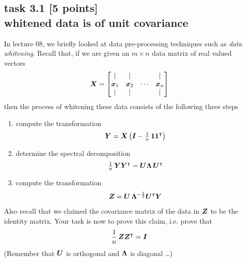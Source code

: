 
\subsection*{task 3.1 [5 points] \\[1ex] whitened data is of unit covariance}

In lecture 08, we briefly looked at data pre-processing techniques such as \emph{data whitening}. Recall that, if we are given an $m \times n$ data matrix of real valued vectors
\begin{equation*}
\bm{X} = 
\begin{bmatrix}
\arrowvert    & \arrowvert    &        & \arrowvert \\
\bm{x}_1 & \bm{x}_2 & \cdots & \bm{x}_n \\
\arrowvert    & \arrowvert    &        & \arrowvert \\
\end{bmatrix}
\end{equation*}
then the process of whitening these data consists of the following three steps
\begin{enumerate}
\item compute the transformation
  \begin{equation*}
  \bm{Y} = \bm{X} \, \bigl( \bm{I} - \tfrac{1}{n} \, \bm{1} \bm{1}^\intercal \bigr)
  \end{equation*}
\item determine the spectral decomposition
  \begin{equation*}
  \tfrac{1}{n} \, \bm{Y} \bm{Y}^\intercal = \bm{U} \bm{\Lambda} \, \bm{U}^\intercal
  \end{equation*}
\item  compute the transformation
  \begin{equation*}
  \bm{Z} = \bm{U} \, \bm{\Lambda}^{-\frac{1}{2}} \bm{U}^\intercal \bm{Y}
  \end{equation*}
\end{enumerate}
Also recall that we claimed the covariance matrix of the data in $\bm{Z}$ to be the identity matrix. Your task is now to prove this claim, i.e. prove that
\begin{equation*}
\frac{1}{n} \, \bm{Z} \bm{Z}^\intercal = \bm{I}
\end{equation*}
(Remember that $\bm{U}$ is orthogonal and $\bm{\Lambda}$ is diagonal \ldots)
\color{blue} \\[1ex]
